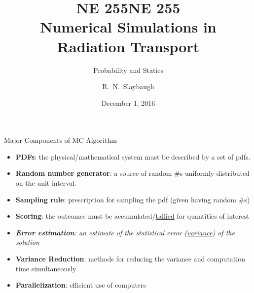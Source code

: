 \documentclass[xcolor=x11names,compress, handout]{beamer}
\title{NE 255}
\author{R.\ N.\ Slaybaugh}
\date{December 1, 2016}
\renewcommand{\(}{\begin{columns}}
\renewcommand{\)}{\end{columns}}
\newcommand{\<}[1]{\begin{column}{#1}}
\renewcommand{\>}{\end{column}}
\begin{document}
\begin{frame}
\title{NE 255\\Numerical Simulations in Radiation Transport}
\subtitle{Probability and Statics}
\titlepage
\end{frame}

\begin{frame}{Major Components of MC Algorithm}

\begin{itemize}
  \item \textbf{PDFs}: the physical/mathematical system must be described by a set of pdfs.
  \item \textbf{Random number generator}: a source of random \#s uniformly distributed on the unit interval.
  \item \textbf{Sampling rule}: prescription for sampling the pdf (given having random \#s)
  \item \textbf{Scoring}: the outcomes must be accumulated/\underline{tallied} for quantities of interest
  \item \textit{\textbf{Error estimation}: an estimate of the statistical error (\underline{variance}) of the solution}
  \item \textbf{Variance Reduction}: methods for reducing the variance and computation time simultaneously
  \item \textbf{Parallelization}: efficient use of computers
\end{itemize}
\end{frame}
\end{document}
